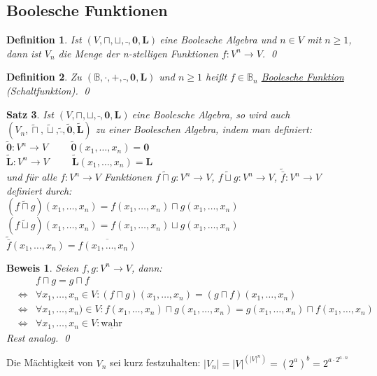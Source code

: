 \documentclass[ngerman]{scrartcl}
\theoremstyle{custom}
\newtheorem{mdef}{Definition} \numberwithin{mdef}{subsection}
\newtheorem{ms}[mdef]{Satz}
\newtheorem*{bw}{Beweis}
\newcommand{\0}{\mathbf{0}}
\newcommand{\1}{\mathbf{L}}
\newcommand{\ba}{$(V, \sqcap, \sqcup, \bar~, \0, \1)~$}
\begin{document}
\subsection{Boolesche Funktionen}
\begin{mdef}
Ist \ba eine Boolesche Algebra und $n \in V$ mit $n \geq 1$, dann ist
$V_n$ die Menge der n-stelligen Funktionen $f: V^n \rightarrow V$.
\qed
\end{mdef}
\begin{mdef}
Zu $(\mathds{B}, \cdot, +, \bar~, \0, \1)$ und $n \geq 1$ hei\ss t $f
\in \mathds{B}_n$ \underline{Boolesche Funktion} (Schaltfunktion).
\qed
\end{mdef}

\begin{ms}
Ist \ba eine Boolesche Algebra, so wird auch $(V_n,
\widetilde{\sqcap}, \widetilde{\sqcup}, \widetilde{\bar~},
\widetilde{\0}, \widetilde{\1})$ zu einer Booleschen Algebra, indem
man definiert:\\
$\widetilde{\0}: V^n \rightarrow V \hspace{1cm} \widetilde{\0}(x_1,
\dots, x_n) = \0$\\
$\widetilde{\1}: V^n \rightarrow V \hspace{1cm} \widetilde{\1}(x_1,
\dots, x_n) = \1$\\
und f\"ur alle $f:V^n \rightarrow V$ Funktionen $f \widetilde{\sqcap}
g:V^n \rightarrow V$, $f \widetilde{\sqcup} g: V^n \rightarrow V$,
$\widetilde{\bar f}: V^n \rightarrow V$ definiert durch:\\
$(f \widetilde{\sqcap} g)(x_1, \dots, x_n) = f(x_1, \dots, x_n) \sqcap
g(x_1, \dots, x_n)$\\
$(f \widetilde{\sqcup} g)(x_1, \dots, x_n) = f(x_1, \dots, x_n) \sqcup
g(x_1, \dots, x_n)$\\
$\widetilde{\bar f}(x_1, \dots, x_n) = \overline{f(x_1, \dots, x_n)}$
\end{ms}

\begin{bw}
Seien $f,g:V^n \rightarrow V$, dann:
\begin{eqnarray*}
&&f \sqcap g = g \sqcap f \\
&\Leftrightarrow& \forall x_1, \dots, x_n \in V: (f \sqcap g)(x_1,
\dots, x_n) = (g \sqcap f)(x_1, \dots, x_n)\\
&\Leftrightarrow& \forall x_1, \dots, x_n) \in V: f (x_1, \dots, x_
n) \sqcap g (x_1, \dots, x_n) = g (x_1, \dots, x_n) \sqcap f(x_1,
\dots, x_n)\\
&\Leftrightarrow& \forall x_1, \dots, x_n \in V:
\underline{\text{wahr}}
\end{eqnarray*}
Rest analog.
\qed
\end{bw}
Die M\"achtigkeit von $V_n$ sei kurz festzuhalten: $\vert V_n \vert =
\vert V\vert^{(\vert V\vert^n)} = (2^a)^b = 2^{a\cdot 2^{a\cdot n}}$\\
\end{document}
